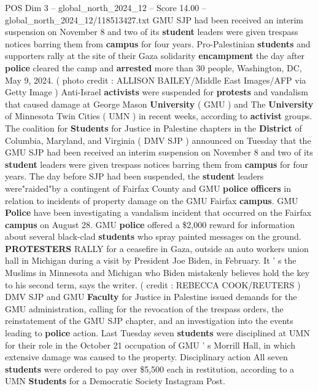 \begin{textsample}{POS Dim 3 – global\_north\_2024\_12 – Score 14.00 – global\_north\_2024\_12/118513427.txt}  \label{ex:f3_pos_217}
GMU SJP had been received an interim suspension on November 8 and two of its \textbf{student} leaders were given trespass notices barring them from \textbf{campus} for four years.
Pro-Palestinian \textbf{students} and supporters rally at the site of their Gaza solidarity \textbf{encampment} the day after \textbf{police} cleared the camp and \textbf{arrested} more than 30 people, Washington, DC, May 9, 2024. ( photo credit : ALLISON BAILEY/Middle East Images/AFP via Getty Image ) Anti-Israel \textbf{activists} were suspended for \textbf{protests} and vandalism that caused damage at George Mason \textbf{University} ( GMU ) and The \textbf{University} of Minnesota Twin Cities ( UMN ) in recent weeks, according to \textbf{activist} groups.
The coalition for \textbf{Students} for Justice in Palestine chapters in the \textbf{District} of Columbia, Maryland, and Virginia ( DMV SJP ) announced on Tuesday that the GMU SJP had been received an interim suspension on November 8 and two of its \textbf{student} leaders were given trespass notices barring them from \textbf{campus} for four years.
The day before SJP had been suspended, the \textbf{student} leaders were"raided"by a contingent of Fairfax County and GMU \textbf{police} \textbf{officers} in relation to incidents of property damage on the GMU Fairfax \textbf{campus}.
GMU \textbf{Police} have been investigating a vandalism incident that occurred on the Fairfax \textbf{campus} on August 28.
GMU \textbf{police} offered a \$2,000 reward for information about several black-clad \textbf{students} who spray painted messages on the ground. \textbf{PROTESTERS} RALLY for a ceasefire in Gaza, outside an auto workers union hall in Michigan during a visit by President Joe Biden, in February.
It ' s the Muslims in Minnesota and Michigan who Biden mistakenly believes hold the key to his second term, says the writer. ( credit : REBECCA COOK/REUTERS ) DMV SJP and GMU \textbf{Faculty} for Justice in Palestine issued demands for the GMU administration, calling for the revocation of the trespass orders, the reinstatement of the GMU SJP chapter, and an investigation into the events leading to \textbf{police} action.
Last Tuesday seven \textbf{students} were disciplined at UMN for their role in the October 21 occupation of GMU ' s Morrill Hall, in which extensive damage was caused to the property.
Disciplinary action All seven \textbf{students} were ordered to pay over \$5,500 each in restitution, according to a UMN \textbf{Students} for a Democratic Society Instagram Post.

\end{textsample}
